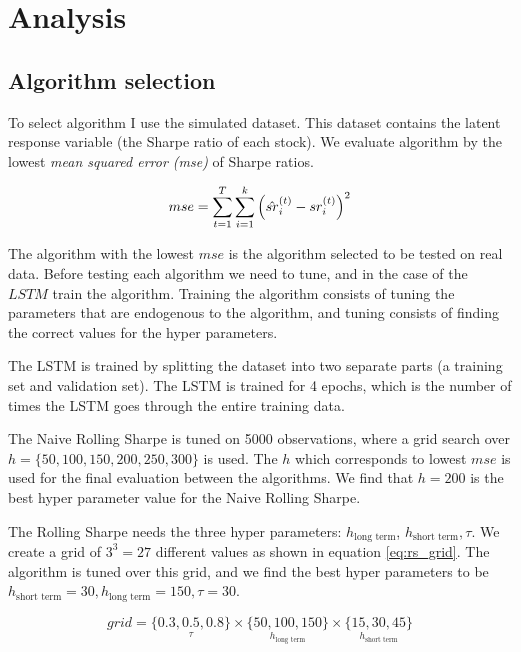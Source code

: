 \section{Analysis}

\subsection{Algorithm selection}

To select algorithm I use the simulated dataset. This dataset contains the latent response variable (the Sharpe ratio of each stock). We evaluate algorithm by the lowest \textit{mean squared error (mse)} of Sharpe ratios.

\begin{equation}\label{eq:meansquarederror}
    mse = \sum_{t=1}^{T} \sum_{i=1}^{k}\left( \hat{sr}_{i}^{(t)} - sr_{i}^{(t)} \right)^2
\end{equation}

The algorithm with the lowest $mse$ is the algorithm selected to be tested on real data. Before testing each algorithm we need to tune, and in the case of the $LSTM$ train the algorithm. Training the algorithm consists of tuning the parameters that are endogenous to the algorithm, and tuning consists of finding the correct values for the hyper parameters.

The LSTM is trained by splitting the dataset into two separate parts (a training set and validation set). The LSTM is trained for 4 epochs, which is the number of times the LSTM goes through the entire training data.

The Naive Rolling Sharpe is tuned on 5000 observations, where a grid search over $h= \{50, 100, 150, 200, 250, 300\}$ is used. The $h$ which corresponds to lowest $mse$ is used for the final evaluation between the algorithms. We find that $h=200$ is the best hyper parameter value for the Naive Rolling Sharpe.

The Rolling Sharpe needs the three hyper parameters: $ h_{\text{long term}}$, $h_{\text{short term}}, \tau$. We create a grid of $3^3=27$ different values as shown in equation \ref{eq:rs_grid}. The algorithm is tuned over this grid, and we find the best hyper parameters to be $h_{\text{short term}} = 30, h_{\text{long term}} = 150, \tau = 30 $.

\begin{equation}\label{eq:rs_grid}
    grid = \underset{\tau}{\{0.3, 0.5, 0.8\}} \times \underset{h_{\text{long term}}}{\{50, 100, 150\}} \times \underset{h_{\text{short term}}}{\{15, 30, 45\}}
\end{equation}

